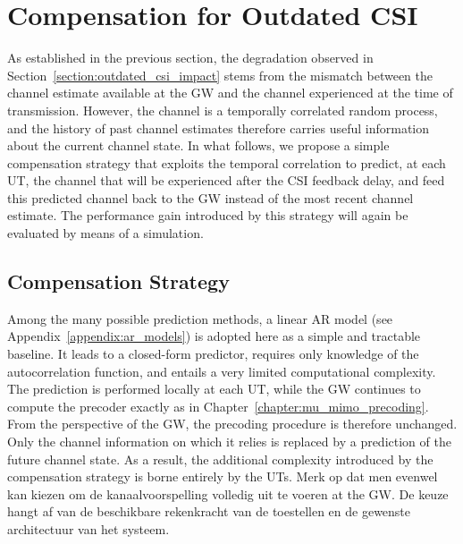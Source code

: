\section{Compensation for Outdated CSI}
\label{section:outdated_csi_compensation}

As established in the previous section, the degradation observed in Section~\ref{section:outdated_csi_impact} stems from the mismatch between the channel estimate available at the \ac{GW} and the channel experienced at the time of transmission.
However, the channel is a temporally correlated random process, and the history of past channel estimates therefore carries useful information about the current channel state.
In what follows, we propose a simple compensation strategy that exploits the temporal correlation to predict, at each \ac{UT}, the channel that will be experienced after the \ac{CSI} feedback delay, and feed this predicted channel back to the \ac{GW} instead of the most recent channel estimate.
The performance gain introduced by this strategy will again be evaluated by means of a simulation.

\subsection{Compensation Strategy}
\label{subsection:compensation_strategy}

Among the many possible prediction methods, a linear \acf{AR} model (see Appendix~\ref{appendix:ar_models}) is adopted here as a simple and tractable baseline. It leads to a closed-form predictor, requires only knowledge of the autocorrelation function, and entails a very limited computational complexity.
The prediction is performed locally at each \ac{UT}, while the \ac{GW} continues to compute the precoder exactly as in Chapter~\ref{chapter:mu_mimo_precoding}. From the perspective of the \ac{GW}, the precoding procedure is therefore unchanged. Only the channel information on which it relies is replaced by a prediction of the future channel state. As a result, the additional complexity introduced by the compensation strategy is borne entirely by the \acp{UT}.
Merk op dat men evenwel kan kiezen om de kanaalvoorspelling volledig uit te voeren at the \ac{GW}. 
De keuze hangt af van de beschikbare rekenkracht van de toestellen en de gewenste architectuur van het systeem.

